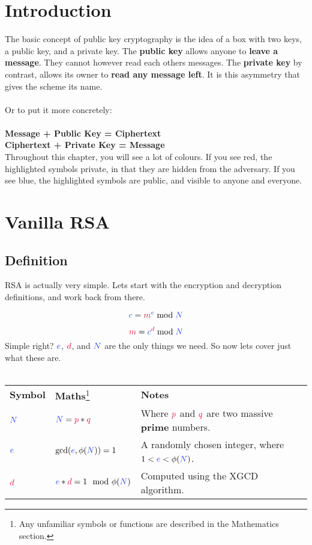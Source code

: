 
\section{Introduction}

	The basic concept of public key cryptography is the idea of a box with two keys, a public key, and a private key. The \textbf{public key} allows anyone to \textbf{leave a message}. They cannot however read each others messages. The \textbf{private key} by contrast, allows its owner to \textbf{read any message left}. It is this asymmetry that gives the scheme its name.\\
	\\
	Or to put	it more concretely:\\
	\\
	\textbf{Message + \textcolor{B}{Public Key} = Ciphertext}\\
	\textbf{Ciphertext + \textcolor{R}{Private Key} = Message}\\

	Throughout this chapter, you will see a lot of colours. If you see \textcolor{R}{red}, the highlighted symbols \textcolor{R}{private}, in that they are hidden from the adversary. If you see \textcolor{B}{blue}, the highlighted symbols are \textcolor{B}{public}, and visible to anyone and everyone.

\section{Vanilla RSA}

	\subsection{Definition}

		RSA is actually very simple. Lets start with the encryption and decryption definitions, and work back from there.

		$$ \cc = \cm^{\ce} \bmod \cN $$

		$$ \cm = \cc^{\cd} \bmod \cN $$
		Simple right? $\ce$, $\cd$, and $\cN$ are the only things we need. So now lets cover just what these are.\\
		\\
	  \begin{tabularx}{\linewidth}{l l X}
		  \textbf{Symbol} & \textbf{Maths}\footnote{Any unfamiliar symbols or functions are described in the Mathematics section.} & \textbf{Notes}\\
		  $\textcolor{B}{N}$ & $\cN = \cp * \cq$ & Where $\cp$ and $\cq$ are two massive \textbf{prime} numbers.
		  \\
		  $\ce$ & $\gcd(\ce,\phi(\cN))=1$ & A randomly chosen integer, where $1 < \ce < \phi(\cN)$.
		  \\
		  $\cd$ & $\ce*\cd = 1 \mod \phi(\cN)$ & Computed using the XGCD algorithm.
		  \\
	  \end{tabularx}
	  
